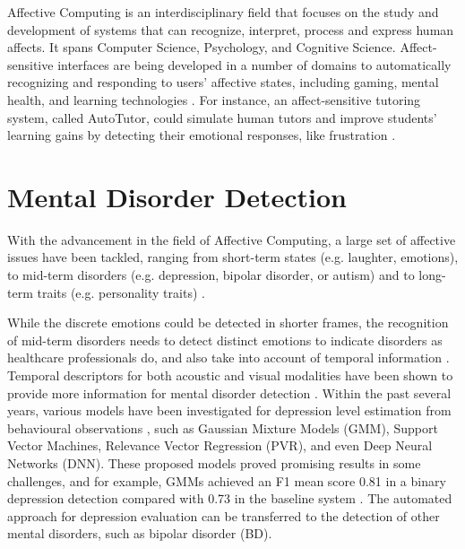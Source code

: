 Affective Computing is an interdisciplinary field that focuses on the study and development of systems that can recognize, interpret, process and express human affects. It spans Computer Science, Psychology, and Cognitive Science. Affect-sensitive interfaces are being developed in a number of domains to automatically recognizing and responding to users' affective states, including gaming, mental health, and learning technologies \cite{calvo2010}. For instance, an affect-sensitive tutoring system, called AutoTutor, could simulate human tutors and improve students' learning gains by detecting their emotional responses, like frustration \cite{sidney2005}.









\section{Mental Disorder Detection}

With the advancement in the field of Affective Computing, a large set of affective issues have been tackled, ranging from short-term states (e.g. laughter, emotions), to mid-term disorders (e.g. depression, bipolar disorder, or autism) and to long-term traits (e.g. personality traits) \cite{picard2000, schuller2011}. 

While the discrete emotions could be detected in shorter frames, the recognition of mid-term disorders needs to detect distinct emotions to indicate disorders as healthcare professionals do, and also take into account of temporal information \cite{picard2000, yacoob1994, zacharatos2014}. Temporal descriptors for both acoustic and visual modalities have been shown to provide more information for mental disorder detection \cite{ambadar2005, joshi2013}. Within the past several years, various models have been investigated for depression level estimation from behavioural observations \cite{cohn2007, cummins2011}, such as Gaussian Mixture Models (GMM), Support Vector Machines, Relevance Vector Regression (PVR), and even Deep Neural Networks (DNN). These proposed models proved promising results in some challenges, and for example, GMMs achieved an F1 mean score 0.81 in a binary depression detection compared with 0.73 in the baseline system \cite{williamson2016}. The automated approach for depression evaluation can be transferred to the detection of other mental disorders, such as bipolar disorder (BD).




